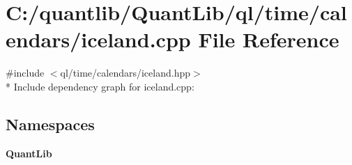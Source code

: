 \section{C\+:/quantlib/\+Quant\+Lib/ql/time/calendars/iceland.cpp File Reference}
\label{iceland_8cpp}
{\ttfamily \#include $<$ql/time/calendars/iceland.\+hpp$>$}\\*
Include dependency graph for iceland.\+cpp\+:
\subsection*{Namespaces}
\begin{DoxyCompactItemize}
\item 
 {\bf Quant\+Lib}
\end{DoxyCompactItemize}
